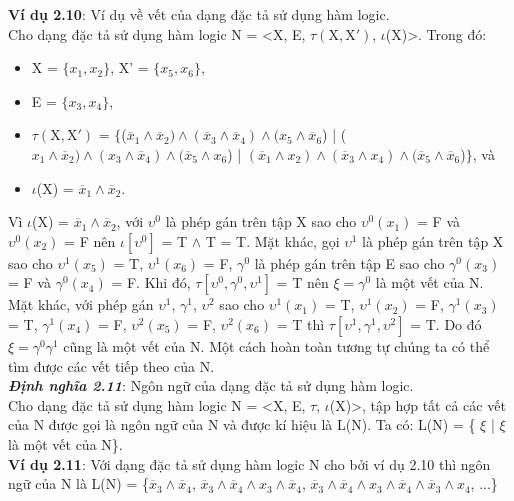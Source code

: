 \documentclass[a4paper,13pt,oneside,openany]{book}
\begin{document}
\begin{flushleft}
		\textbf{Ví dụ 2.10}: Ví dụ về vết của dạng đặc tả sử dụng hàm logic.\\
		Cho dạng đặc tả sử dụng hàm logic N = <X, E, $\tau(\textrm{X}, \textrm{X}')$, $\iota$(X)>. Trong đó:\\
		\begin{itemize}
			\item X = $\{x_1, x_2\}$, X' = $\{x_5, x_6\}$,
			\item E = $\{x_3, x_4\}$,
			\item $\tau(\textrm{X}, \textrm{X}')$ = $\{$($\overline{x}_1 \land \overline{x}_2) \land (\overline{x}_3 \land \overline{x}_4) \land (x_5 \land \overline{x}_6$) | ($x_1\land\overline{x}_2)\land (x_3\land \overline{x}_4)\land (\overline{x}_5 \land x_6$) | $(\overline{x}_1\land x_2)\land(\overline{x}_3\land x_4)\land (\overline{x}_5\land\overline{x}_6$)$\}$, và
			\item $\iota$(X) = $\overline{x}_1 \land \overline{x}_2$.
		\end{itemize}
		Vì $\iota$(X) = $\overline{x}_1 \land \overline{x}_2$, với $\upsilon^0$ là phép gán trên tập X sao cho $\upsilon^0(x_1)$ = F và $\upsilon^0(x_2)$ = F nên $\iota[\upsilon^0]$ = T $\land$ T = T. Mặt khác, gọi $\upsilon^1$ là phép gán trên tập X sao cho $\upsilon^1(x_5)$ = T, $\upsilon^1(x_6)$ = F, $\gamma^0$ là phép gán trên tập E sao cho $\gamma^0(x_3)$ = F và $\gamma^0(x_4)$ = F. Khi đó, $\tau[\upsilon^0, \gamma^0, \upsilon^1]$ = T nên $\xi = \gamma^0$ là một vết của N.
		Mặt khác, với phép gán $\upsilon^1$, $\gamma^1$,  $\upsilon^2$ sao cho $\upsilon^1(x_1)$ = T, $\upsilon^1(x_2)$ = F, $\gamma^1(x_3)$ = T, $\gamma^1(x_4)$ = F, $\upsilon^2(x_5)$ = F,  $\upsilon^2(x_6)$ = T thì $\tau[\upsilon^1, \gamma^1, \upsilon^2]$ = T. Do đó $\xi = \gamma^0\gamma^1$ cũng là một vết của N. Một cách hoàn toàn tương tự chúng ta có thể tìm được các vết tiếp theo của N.\\
		\textbf{\textit{Định nghĩa 2.11}}: Ngôn ngữ của dạng đặc tả sử dụng hàm logic.\\
		Cho dạng đặc tả sử dụng hàm logic N = <X, E, $\tau$, $\iota$(X)>, tập hợp tất cả các vết của N được gọi là ngôn ngữ của N và được kí hiệu là L(N). Ta có: L(N) =  \{ $\xi$ | $\xi$ là một vết của N\}.\\
		\textbf{Ví dụ 2.11}: Với dạng đặc tả sử dụng hàm logic N cho bởi ví dụ 2.10 thì ngôn ngữ của N là L(N) = \{$\overline{x}_3 \land \overline{x}_4$, $\overline{x}_3 \land \overline{x}_4 \land x_3 \land \overline{x}_4$, $\overline{x}_3 \land \overline{x}_4 \land x_3 \land \overline{x}_4 \land \overline{x}_3 \land x_4$, ...\}

\end{flushleft}
\end{document}
